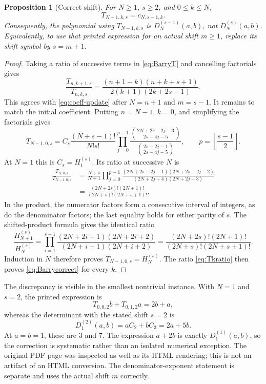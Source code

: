 \documentclass[11pt,a4paper]{article}
\numberwithin{equation}{section}
\newtheorem{proposition}[theorem]{Proposition}
\theoremstyle{definition}
\theoremstyle{remark}
\begin{document}
\begin{proposition}[Correct shift]\label{prop:Barry}
For $N\geq1$, $s\geq2$, and $0\leq k\leq N$,
\begin{equation}\label{eq:Barrycorrect}
 T_{N-1,k,s}=c_{N,s-1,k}.
\end{equation}
Consequently, the polynomial using $T_{N-1,k,s}$ is
$D_N^{(s-1)}(a,b)$, not $D_N^{(s)}(a,b)$.  Equivalently, to use that
printed expression for an actual shift $m\geq1$, replace its shift
symbol by $s=m+1$.
\end{proposition}
\begin{proof}
Taking a ratio of successive terms in \eqref{eq:BarryT} and cancelling
factorials gives
\begin{equation}\label{eq:Tkratio}
 \frac{T_{n,k+1,s}}{T_{n,k,s}}
 =\frac{(n+1-k)(n+k+s+1)}{2(k+1)(2k+2s-1)}.
\end{equation}
This agrees with \eqref{eq:coeff-update} after $N=n+1$ and $m=s-1$.
It remains to match the initial coefficient.
Putting $n=N-1$, $k=0$, and simplifying the factorials gives
\begin{equation}\label{eq:TB0}
 T_{N-1,0,s}=C_s\frac{(N+s-1)!}{N!s!}
 \prod_{j=0}^{p-1}
 \frac{\binom{2N+2s-2j-3}{2s-4j-5}}
      {\binom{2s-2j-1}{2s-4j-5}},
 \qquad p=\left\lfloor\frac{s-1}{2}\right\rfloor.
\end{equation}
At $N=1$ this is $C_s=H_1^{(s)}$.  Its ratio at successive $N$ is
\begin{align}
 \frac{T_{N,0,s}}{T_{N-1,0,s}}
 &=\frac{N+s}{N+1}
   \prod_{j=0}^{p-1}
   \frac{(2N+2s-2j-1)(2N+2s-2j-2)}
        {(2N+2j+4)(2N+2j+3)}\nonumber\\
 &=\frac{(2N+2s)!(2N+1)!}
         {(2N+s)!(2N+s+1)!}.
 \label{eq:TNr}
\end{align}
In the product, the numerator factors form a consecutive interval of
integers, as do the denominator factors; the last equality holds for
either parity of $s$.  The shifted-product formula gives the identical
ratio
\[
 \frac{H_{N+1}^{(s)}}{H_N^{(s)}}
 =\prod_{i=1}^{s-1}
     \frac{(2N+2i+1)(2N+2i+2)}{(2N+i+1)(2N+i+2)}
 =\frac{(2N+2s)!(2N+1)!}{(2N+s)!(2N+s+1)!}.
\]
Induction in $N$ therefore proves $T_{N-1,0,s}=H_N^{(s)}$.
The ratio \eqref{eq:Tkratio} then proves \eqref{eq:Barrycorrect}
for every $k$.
\end{proof}

The discrepancy is visible in the smallest nontrivial instance.
With $N=1$ and $s=2$, the printed expression is
\[
 T_{0,0,2}b+T_{0,1,2}a=2b+a,
\]
whereas the determinant with the stated shift $s=2$ is
\[
 D_1^{(2)}(a,b)=aC_2+bC_3=2a+5b.
\]
At $a=b=1$, these are $3$ and $7$.  The expression $a+2b$ is exactly
$D_1^{(1)}(a,b)$, so the correction is systematic rather than an isolated
numerical exception.  The original PDF page was inspected as well as
its HTML rendering; this is not an artifact of an HTML conversion.
The denominator-exponent statement is separate and uses the actual
shift $m$ correctly.
\end{document}

